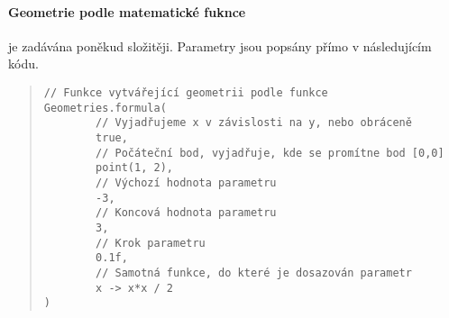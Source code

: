 

\paragraph{Geometrie podle matematické fuknce} je zadávána poněkud složitěji. Parametry jsou popsány přímo v následujícím kódu.


\begin{minipage}{\textwidth}\begin{quote}\begin{lstlisting}
// Funkce vytvářející geometrii podle funkce
Geometries.formula(
        // Vyjadřujeme x v závislosti na y, nebo obráceně
        true,
        // Počáteční bod, vyjadřuje, kde se promítne bod [0,0]
        point(1, 2),
        // Výchozí hodnota parametru
        -3,
        // Koncová hodnota parametru
        3,
        // Krok parametru
        0.1f,
        // Samotná funkce, do které je dosazován parametr
        x -> x*x / 2
)
\end{lstlisting}\end{quote}\end{minipage}


